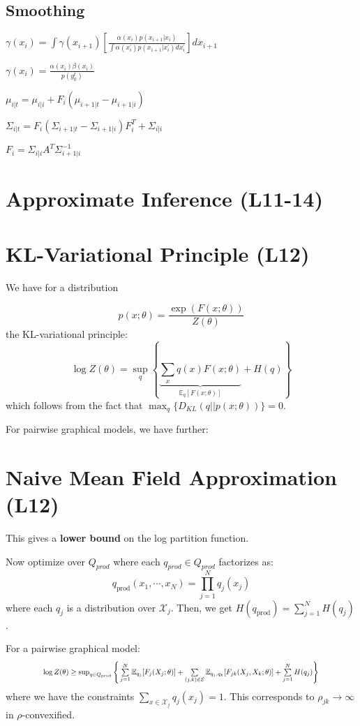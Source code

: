 \documentclass[9pt]{article}
\begin{document}
\begin{multicols}{2}
\subsection{Smoothing}
$\gamma(x_i) = \int \gamma(x_{i+1})\left[ \frac{\alpha(x_i)p(x_{i+1} | x_i)}{\int \alpha(x_i^\prime)p(x_{i+1} | x_i^\prime) dx_i^\prime}\right] d x_{i+1}$

$\gamma(x_i) = \frac{\alpha(x_i) \beta(x_i)}{p(y_0^t)}$

$\mu_{i|t} = \mu_{i|i} + F_i(\mu_{i+1|t} - \mu_{i+1|i})$

$\Sigma_{i|t} = F_i(\Sigma_{i+1|t} - \Sigma_{i+1|i})F_i^T + \Sigma_{i|i}$

$F_i = \Sigma_{i|i}A^T\Sigma_{i+1|i}^{-1}$

\section{Approximate Inference (L11-14)}

\section{KL-Variational Principle (L12)}
We have for a distribution 

$$p(x;\theta) = \frac{\exp\left(F(x;\theta)\right)}{Z(\theta)}$$
the KL-variational principle:
$$\log Z(\theta)=\sup_{q}\left\{\underbrace{\sum\limits_{x}q(x)F(x;\theta)}_{\mathbb{E}_q[F(x;\theta)]}+ H(q)\right\}$$ which follows from the fact that $\max_{q}\{D_{KL}(q||p(x;\theta))\} = 0$.

For pairwise graphical models, we have further: 

\section{Naive Mean Field Approximation (L12)}

This gives a \textbf{lower bound} on the log partition function.

Now optimize over $Q_{prod}$ where each $q_{prod} \in Q_{prod}$ factorizes as:
$$q_{\text{prod}}(x_1,\cdots,x_{N})=\prod_{j=1}^{N}q_j(x_j)$$
where each $q_j$ is a distribution over $\mathcal{X}_j$. Then,
we get $H(q_{\text{prod}})=\sum_{j=1}^{N}H(q_j)$. 

For a pairwise graphical model:
\[
\scalebox{0.75}{
\(
\log Z(\theta) \geq \sup_{q \in Q_{\text{prod}}} \Bigg\{
    \sum\limits_{j=1}^{N} \mathbb{E}_{q_j}[F_{j}(X_j; \theta)]
    + \sum\limits_{(j,k) \in \mathcal{E}} \mathbb{E}_{q_j, q_k}[F_{jk}(X_j, X_k; \theta)]
    + \sum\limits_{j=1}^{N} H(q_j)
\Bigg\}
\)
}
\]
where we have the constraints $\sum_{x \in \mathcal{X}_j}q_j(x_j)=1$.  This corresponds to $\rho_{jk} \to
\infty$ in $\rho$-convexified. 


\end{multicols}
\end{document}
